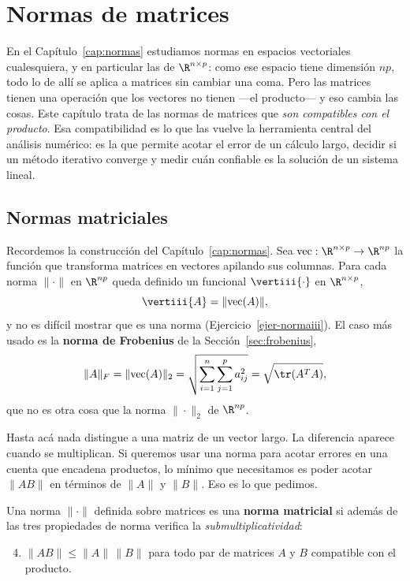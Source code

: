 \chapter{Normas de matrices}\label{cap:normas-matrices}

En el Capítulo~\ref{cap:normas} estudiamos normas en espacios vectoriales
cualesquiera, y en particular las de $\R^{n\times p}$: como ese espacio tiene
dimensión $np$, todo lo de allí se aplica a matrices sin cambiar una coma.
Pero las matrices tienen una operación que los vectores no tienen ---el
producto--- y eso cambia las cosas. Este capítulo trata de las normas de
matrices que \emph{son compatibles con el producto}. Esa compatibilidad es lo
que las vuelve la herramienta central del análisis numérico: es la que
permite acotar el error de un cálculo largo, decidir si un método iterativo
converge y medir cuán confiable es la solución de un sistema lineal.

\section{Normas matriciales}
\label{sec:normas-matriciales}

Recordemos la construcción del Capítulo~\ref{cap:normas}. Sea
$\textup{vec}:\R^{n\times p}\rightarrow\R^{np}$ la función que transforma
matrices en vectores apilando sus columnas. Para cada norma $\|\cdot\|$ en
$\R^{np}$ queda definido un funcional $\vertiii{\cdot}$ en $\R^{n\times p}$,
\[
\vertiii{A}=\|\textup{vec}(A)\| ,
\]
y no es difícil mostrar que es una norma (Ejercicio~\ref{ejer-normaiii}). El
caso más usado es la \textbf{norma de Frobenius} de la
Sección~\ref{sec:frobenius},
\[
\|A\|_F=\|\textup{vec}(A)\|_2=\sqrt{\sum_{i=1}^n\sum_{j=1}^p a_{ij}^2}
=\sqrt{\tr(A^TA)} ,
\]
que no es otra cosa que la norma $\|\cdot\|_2$ de $\R^{np}$.

Hasta acá nada distingue a una matriz de un vector largo. La diferencia
aparece cuando se multiplican. Si queremos usar una norma para acotar errores
en una cuenta que encadena productos, lo mínimo que necesitamos es poder
acotar $\|AB\|$ en términos de $\|A\|$ y $\|B\|$. Eso es lo que pedimos.

\begin{defn}\label{def:norma-matricial}
Una norma $\|\cdot\|$ definida sobre matrices es una \textbf{norma matricial}
si además de las tres propiedades de norma verifica la
\emph{submultiplicatividad}:
\begin{enumerate}[label=(n\arabic*)]
\setcounter{enumi}{3}
\item $\|AB\|\le\|A\|\,\|B\|$ para todo par de matrices $A$ y $B$ compatible
con el producto.
\end{enumerate}
\end{defn}

